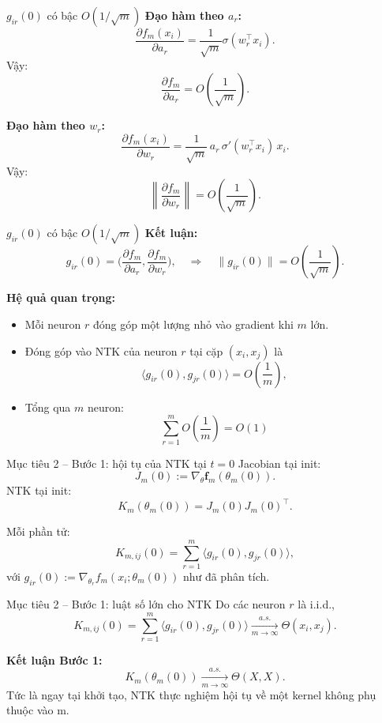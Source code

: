 \documentclass[12pt]{beamer}
\begin{document}
\begin{frame}{$g_{ir}(0)$ có bậc $O(1/\sqrt{m})$}
      \textbf{Đạo hàm theo $a_r$:}
  \[
    \frac{\partial f_m(x_i)}{\partial a_r}
    = \frac{1}{\sqrt{m}} \sigma(w_r^\top x_i).
  \]
Vậy:
  \[
    \frac{\partial f_m}{\partial a_r}
    = O\!\left(\frac{1}{\sqrt{m}}\right).
  \]

  \vspace{0.2cm}
  \textbf{Đạo hàm theo $w_r$:}
  \[
    \frac{\partial f_m(x_i)}{\partial w_r}
    = \frac{1}{\sqrt{m}}\,a_r\,\sigma'(w_r^\top x_i)\, x_i.
  \]
Vậy:
  \[
    \left\|\frac{\partial f_m}{\partial w_r}\right\|
    = O\!\left(\frac{1}{\sqrt{m}}\right).
  \]
  \vspace{0.5cm}
\end{frame}
\begin{frame}{$g_{ir}(0)$ có bậc $O(1/\sqrt{m})$}
  \textbf{Kết luận:}
  \[
    g_{ir}(0)
    =
    \Big(
      \frac{\partial f_m}{\partial a_r},
      \frac{\partial f_m}{\partial w_r}
    \Big),
    \quad
    \Rightarrow\quad
    \|g_{ir}(0)\|
    = O\!\left(\frac{1}{\sqrt{m}}\right).
  \]

  \textbf{Hệ quả quan trọng:}
  \begin{itemize}
    \item Mỗi neuron $r$ đóng góp một lượng nhỏ vào gradient khi $m$ lớn.
    \item Đóng góp vào NTK của neuron $r$ tại cặp $(x_i,x_j)$ là
          \[
            \big\langle g_{ir}(0), g_{jr}(0) \big\rangle
            = O\!\left(\frac{1}{m}\right),
          \]
    \item Tổng qua $m$ neuron:
          \[
            \sum_{r=1}^m O\!\left(\frac{1}{m}\right)
            = O(1)
          \]
  \end{itemize}
\end{frame}

\begin{frame}{Mục tiêu 2 – Bước 1: hội tụ của NTK tại $t=0$}
  Jacobian tại init:
  \[
    J_m(0) := \nabla_\theta \mathbf f_m(\theta_m(0)).
  \]
NTK tại init:
  \[
    K_m(\theta_m(0)) = J_m(0)J_m(0)^\top.
  \]

  Mỗi phần tử:
  \[
    K_{m,ij}(0)
      = \sum_{r=1}^m \big\langle g_{ir}(0), g_{jr}(0)\big\rangle,
  \]
  với $g_{ir}(0) := \nabla_{\theta_r} f_m(x_i;\theta_m(0))$ như đã phân tích.

\end{frame}

\begin{frame}{Mục tiêu 2 – Bước 1: luật số lớn cho NTK}
  Do các neuron $r$ là i.i.d.,
  \[
    K_{m,ij}(0)
    = \sum_{r=1}^m \big\langle g_{ir}(0),g_{jr}(0)\big\rangle
    \xrightarrow[m\to\infty]{a.s.} \Theta(x_i,x_j).
  \]

  
  \textbf{Kết luận Bước 1:}
  \[
    K_m(\theta_m(0)) \xrightarrow[m\to\infty]{a.s.} \Theta(X,X).
  \]
  Tức là ngay tại khởi tạo, NTK thực nghiệm hội tụ về một kernel không phụ thuộc vào m.
\end{frame}
\end{document}
